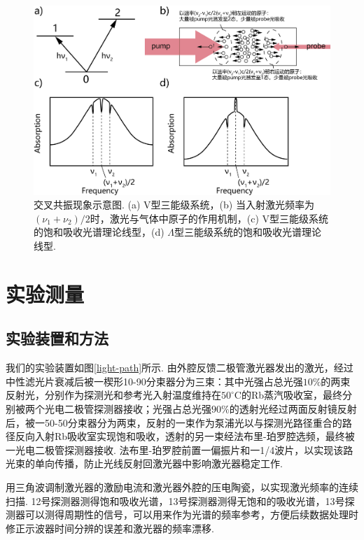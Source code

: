 \documentclass[UTF8,a4paper,10pt]{article}
\begin{document}
\begin{figure}[h]
    \centering
    \includegraphics[width=.8\textwidth]{SAS-2.png}
    \caption{交叉共振现象示意图. (a) V型三能级系统，(b) 当入射激光频率为$(\nu_1+\nu_2)/2$时，激光与气体中原子的作用机制，(c) V型三能级系统的饱和吸收光谱理论线型，(d) $\Lambda$型三能级系统的饱和吸收光谱理论线型.}
    \label{SAS-2}
\end{figure}

\section{实验测量}

\subsection{实验装置和方法}

我们的实验装置如图\ref{light-path}所示. 由外腔反馈二极管激光器发出的激光，经过中性滤光片衰减后被一楔形10-90分束器分为三束：其中光强占总光强$10\%$的两束反射光，分别作为探测光和参考光入射温度维持在$50^{\circ}$C的Rb蒸汽吸收室，最终分别被两个光电二极管探测器接收；光强占总光强$90\%$的透射光经过两面反射镜反射后，被一50-50分束器分为两束，反射的一束作为泵浦光以与探测光路径重合的路径反向入射Rb吸收室实现饱和吸收，透射的另一束经法布里-珀罗腔选频，最终被一光电二极管探测器接收. 法布里-珀罗腔前置一偏振片和一1/4波片，以实现该路光束的单向传播，防止光线反射回激光器中影响激光器稳定工作.

用三角波调制激光器的激励电流和激光器外腔的压电陶瓷，以实现激光频率的连续扫描. \textcircled{\scriptsize{12}}号探测器测得饱和吸收光谱，\textcircled{\scriptsize{13}}号探测器测得无饱和的吸收光谱，\textcircled{\scriptsize{13}}号探测器可以测得周期性的信号，可以用来作为光谱的频率参考，方便后续数据处理时修正示波器时间分辨的误差和激光器的频率漂移.
\end{document}
